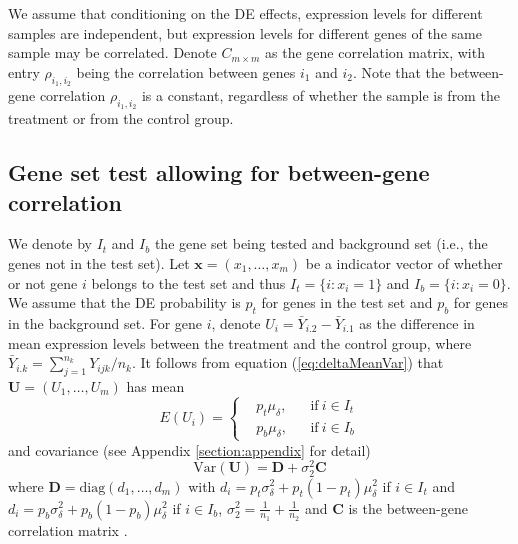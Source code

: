 \documentclass[11pt, a4paper]{article}
\begin{document}
	
	We assume that conditioning on the DE effects, expression levels for different samples are independent, but expression levels for different genes of the same sample may be correlated. Denote $C_{m \times m}$ as the gene correlation matrix, with entry $\rho_{i_1, i_2}$ being the correlation between genes $i_1$ and $i_2$. Note that the between-gene correlation $\rho_{i_1, i_2}$ is a constant, regardless of whether the sample is from the treatment or from the control group. 
	
	\subsection{Gene set test allowing for between-gene  correlation}\label{subsection:enrichmenttest}
	
	We denote by $I_t$ and $I_b$ the gene set being tested and background set (i.e., the genes not in the test set).  
	Let $\bm x = (x_1, \ldots, x_m)$ be a indicator vector of whether or not gene $i$ belongs to the test set and thus $I_t = \{i: x_i =1\}$ and $I_b = \{i: x_i =0\}$. We assume that the DE probability is $p_t$ for genes in the test set and $p_b$ for genes in the background set. For gene $i$, denote $U_i=\bar{Y}_{i.2}-\bar{Y}_{i.1}$ as the difference in mean expression levels between the treatment and the control group, where $\bar{Y}_{i.k}= \sum_{j=1}^{n_k}Y_{ijk}/n_k$. It follows from equation (\ref{eq:deltaMeanVar}) that $\bm U = (U_1, \ldots, U_m)$ has mean
	\begin{equation}\label{eq:expectation}
		E(U_i) = \left \{
		\begin{aligned}
			&p_t\mu_{\delta}, && \text{if}\ i \in I_t \\
			&p_b\mu_{\delta}, && \text{if}\ i \in I_b
		\end{aligned} \right.
	\end{equation} 
	and covariance (see Appendix \ref{section:appendix} for detail) 
	\begin{equation}\label{eq:variance}
		\text{Var}(\bm U) = \bm D  + \sigma_2^2\bm C
	\end{equation}
	where $\bm D = \text{diag}(d_1, \ldots, d_m)$ with $d_i = p_t\sigma_{\delta}^2 + p_t(1-p_t)\mu_{\delta}^2$ if $i\in I_t$ and $d_i =p_b\sigma_{\delta}^2 + p_b(1-p_b)\mu_{\delta}^2$ if $i\in I_b$,  $\sigma_2^2 =\frac{1}{n_1} + \frac{1}{n_2} $ and $\bm C$ is the between-gene correlation matrix . 
	
\end{document}
